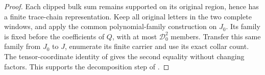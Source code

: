 \begin{proof}
    \leanok
    Each clipped bulk sum remains supported on its original region, hence
    has a finite trace-chain representation. Keep all original letters in
    the two complete windows, and apply the common polynomial-family
    construction on $J_0$. Its family is fixed before the coefficients of
    $Q$, with at most $\mathcal D_0^2$ members. Transfer this same family
    from $J_0$ to $J$, enumerate its finite carrier and use its exact
    collar count. The tensor-coordinate identity of
    \cite[``A conjugated tensor sum with the middle factor first'']
    {QICLean2026Blueprint} gives the second equality without changing factors.
    This supports the decomposition step of
    \cite[Proposition 5.7]{Arad2016RigorousRG}.
\end{proof}
